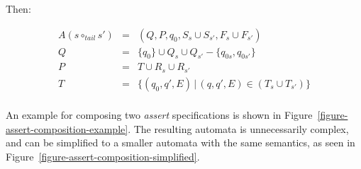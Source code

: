 \documentclass[a4paper,11pt]{kth-mag}
\begin{document}
Then:

\medskip
\[
  \begin{array}{rcl}
    A(s \circ_{tail} s') & = & (Q, P, q_0, S_s \cup S_{s'}, F_s \cup F_{s'}) \\
                       Q & = & \{q_0\} \cup Q_s \cup Q_{s'} - \{q_{0s}, q_{0s'}\} \\
                       P & = & T \cup R_s \cup R_{s'} \\
                       T & = & \{(q_0, q', E) \, | \, (q, q', E) \in (T_s \cup T_{s'})\} \\
  \end{array}
\]
\medskip

An example for composing two \textit{assert} specifications is shown in
Figure~\ref{figure-assert-composition-example}. The resulting automata is
unnecessarily complex, and can be simplified to a smaller automata with the
same semantics, as seen in Figure~\ref{figure-assert-composition-simplified}.
\end{document}
